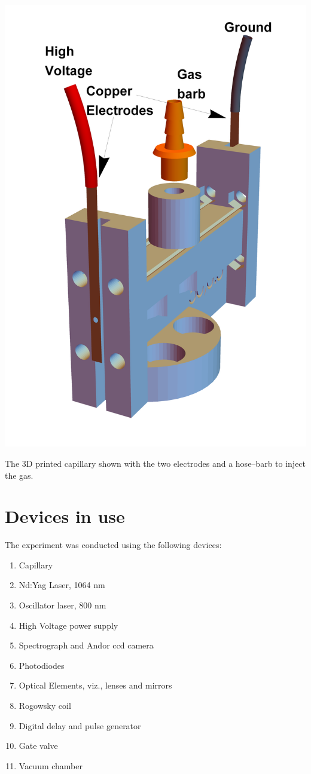 \documentclass[../main.tex]{subfiles}
\begin{document}
\begin{marginfigure}
    \includegraphics[width=\marginparwidth]{figures/cad/setup.pdf}
    \caption{The 3D printed capillary shown with the two electrodes and a hose--barb to inject the gas.}
    \label{fig:setup}
\end{marginfigure}

	\section{Devices in use}\label{sec:devices}
The experiment was conducted using the following devices:
\begin{enumerate}
    \item Capillary
    \item Nd:Yag Laser, 1064 nm
    \item Oscillator laser, 800 nm
    \item High Voltage power supply
    \item Spectrograph and Andor ccd camera
    \item Photodiodes
    \item Optical Elements, viz., lenses and mirrors
    \item Rogowsky coil
    \item Digital delay and pulse generator
    \item Gate valve
    \item Vacuum chamber
\end{enumerate}
\end{document}
